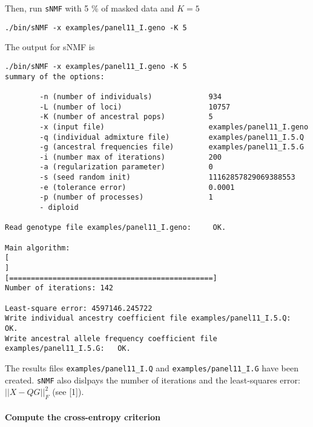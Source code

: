 \documentclass[10pt,a4paper]{article}
\begin{document}
Then, run {\tt sNMF} with 5 \% of masked data and $K=5$
\begin{Verbatim}[frame=single]
./bin/sNMF -x examples/panel11_I.geno -K 5
\end{Verbatim}
\noindent
The output for sNMF is
\begin{Verbatim}[frame=single]
./bin/sNMF -x examples/panel11_I.geno -K 5 
summary of the options:

        -n (number of individuals)             934
        -L (number of loci)                    10757
        -K (number of ancestral pops)          5
        -x (input file)                        examples/panel11_I.geno
        -q (individual admixture file)         examples/panel11_I.5.Q
        -g (ancestral frequencies file)        examples/panel11_I.5.G
        -i (number max of iterations)          200
        -a (regularization parameter)          0
        -s (seed random init)                  11162857829069388553
        -e (tolerance error)                   0.0001
        -p (number of processes)               1
        - diploid

Read genotype file examples/panel11_I.geno:		OK.

Main algorithm:
[                                                                           ]
[===============================================]
Number of iterations: 142

Least-square error: 4597146.245722
Write individual ancestry coefficient file examples/panel11_I.5.Q:		OK.
Write ancestral allele frequency coefficient file examples/panel11_I.5.G:	OK.
\end{Verbatim}

\noindent
The results files \verb|examples/panel11_I.Q| and \verb|examples/panel11_I.G| have been created.
{\tt sNMF} also dislpays the number of iterations and the least-squares error: $||X - QG||_F^2$
(see [1]).

\paragraph{Compute the cross-entropy criterion}
\end{document}
